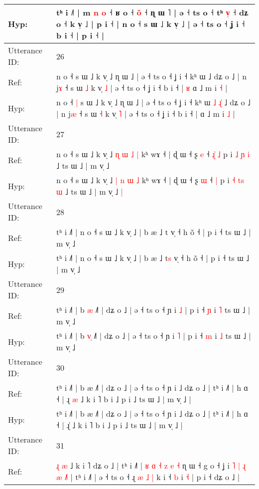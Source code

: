 \documentclass[10pt]{article}
\DeclareRobustCommand{\hl}[1]{{\textcolor{red}{#1}}}
\begin{document}
\begin{longtable}{ll}
 \\
Hyp: & tʰ i ˩˥ | m \hl{n}\hl{ }\hl{o} ˧ ʁ o ˧ \hl{o}\hl{̃} ˧ ɳ ɯ ˥ | ə ˧ ts o ˧ tʰ \hl{v}\hl{̩} ˧ dʑ o ˧ k v̩ ˩ | p i ˧ | n o ˧ s ɯ ˩ k v̩ ˩ | ə ˧ ts o ˧ ʝ i ˧ b i ˧ | p i ˧ |
 \\
\midrule
Utterance ID: & 26 \\
Ref: & n o ˧\hl{}\hl{} s ɯ ˩ k v̩ ˩ ɳ ɯ ˩ | ə ˧ ts o ˧ ʝ i ˧ kʰ ɯ\hl{}\hl{}\hl{}\hl{}\hl{} ˩ dʑ o ˩ | n j\hl{ɤ} ˧ s ɯ \hl{˩} k v̩ \hl{˩} | ə ˧ ts o ˧ ʝ i ˧ b i ˧ |\hl{ }\hl{ʁ} ɑ ˩ m i \hl{˧} |
 \\
Hyp: & n o ˧\hl{ }\hl{|} s ɯ ˩ k v̩ ˩ ɳ ɯ ˩ | ə ˧ ts o ˧ ʝ i ˧ kʰ ɯ\hl{ }\hl{˩}\hl{ }\hl{ɻ}\hl{̍} ˩ dʑ o ˩ | n j\hl{æ} ˧ s ɯ \hl{˧} k v̩ \hl{˥} | ə ˧ ts o ˧ ʝ i ˧ b i ˧ |\hl{}\hl{} ɑ ˩ m i \hl{˩} |
 \\
\midrule
Utterance ID: & 27 \\
Ref: & n o ˧ s ɯ ˩ k v̩ ˩ \hl{ɳ} \hl{ɯ} \hl{˩} \hl{|} kʰ wɤ ˧ | ɖ ɯ ˧ ʂ \hl{e} ˧\hl{ }\hl{ɻ}\hl{̍} \hl{˩} p i \hl{˩} \hl{}\hl{ɲ} \hl{i} ˩ ts ɯ ˩ | m v̩ ˩\hl{}\hl{}
 \\
Hyp: & n o ˧ s ɯ ˩ k v̩ ˩ \hl{|} \hl{n} \hl{ɯ} \hl{˩} kʰ wɤ ˧ | ɖ ɯ ˧ ʂ \hl{ɯ} ˧\hl{}\hl{}\hl{} \hl{|} p i \hl{˧} \hl{t}\hl{s} \hl{ɯ} ˩ ts ɯ ˩ | m v̩ ˩\hl{ }\hl{|}
 \\
\midrule
Utterance ID: & 28 \\
Ref: & tʰ i ˩˥ | n o ˧ s ɯ ˩ k v̩ ˩ | b æ ˩ t\hl{} v̩ ˧ h õ ˧ | p i ˧ ts ɯ ˩ | m v̩ ˩
 \\
Hyp: & tʰ i ˩˥ | n o ˧ s ɯ ˩ k v̩ ˩ | b æ ˩ t\hl{s} v̩ ˧ h õ ˧ | p i ˧ ts ɯ ˩ | m v̩ ˩
 \\
\midrule
Utterance ID: & 29 \\
Ref: & tʰ i ˩˥ | b \hl{}\hl{æ} ˩˥ | dʑ o ˩ | ə ˧ ts o ˧ ɲ i \hl{˩} | p i ˧ \hl{ɲ} i \hl{˥} ts ɯ ˩ | m v̩ ˩
 \\
Hyp: & tʰ i ˩˥ | b \hl{v}\hl{̩} ˩˥ | dʑ o ˩ | ə ˧ ts o ˧ ɲ i \hl{˥} | p i ˧ \hl{m} i \hl{˩} ts ɯ ˩ | m v̩ ˩
 \\
\midrule
Utterance ID: & 30 \\
Ref: & tʰ i ˩˥ | b æ ˩˥ | dʑ o ˩ | ə ˧ ts o ˧ ɲ i ˩ dʑ o ˩ | tʰ i ˩˥ | h ɑ ˧ | ɻ\hl{ }\hl{æ} ˩ k i ˥ b i ˩ p i ˩ ts ɯ ˩ | m v̩ ˩ |
 \\
Hyp: & tʰ i ˩˥ | b æ ˩˥ | dʑ o ˩ | ə ˧ ts o ˧ ɲ i ˩ dʑ o ˩ | tʰ i ˩˥ | h ɑ ˧ | ɻ\hl{}\hl{̍} ˩ k i ˥ b i ˩ p i ˩ ts ɯ ˩ | m v̩ ˩ |
 \\
\midrule
Utterance ID: & 31 \\
Ref: & \hl{ɻ}\hl{ }\hl{æ} ˩ k i ˥ dʑ o ˩ | tʰ i ˩˥ | \hl{ʁ} \hl{ɑ} \hl{˧} \hl{z} \hl{e} \hl{˧} ɳ ɯ ˧\hl{}\hl{} g o ˧ ʝ i\hl{ }\hl{˥}\hl{ }\hl{|}\hl{ }\hl{ɻ}\hl{ }\hl{æ} \hl{˩}˥ | tʰ i ˩˥ | ə ˧ ts o ˧ ɻ\hl{ }\hl{æ}\hl{ }\hl{˩} \hl{|} k i ˧ \hl{}\hl{b} i \hl{}\hl{˧} | p i ˧ dʑ o ˩ |

\end{longtable}
\end{document}
